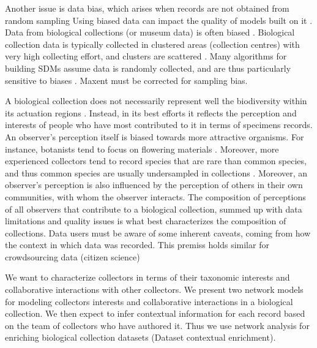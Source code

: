 Another issue is data bias, which arises when records are not obtained from random sampling \cite{Daru2017}
Using biased data can impact the quality of models built on it \cite{Newbold2010}.
Data from biological collections (or museum data) is often biased \cite{Daru2017}.
Biological collection data is typically collected in clustered areas (collection centres) with very high collecting effort, and clusters are scattered \cite{Nelson1990, VanGemerden2005}.
Many algorithms for building SDMs assume data is randomly collected, and are thus particularly sensitive to biases \cite{Araujo2016} .
Maxent must be corrected for sampling bias.%


A biological collection does not necessarily represent well the biodiversity within its actuation regions \cite{Funk1999}.
Instead, in its best efforts it reflects the perception and interests of people who have most contributed to it in terms of specimens records.
An observer's perception itself is biased towards more attractive organisms. 
For instance, botanists tend to focus on flowering materials \cite{VanGemerden2005}.
Moreover, more experienced collectors tend to record species that are rare than common species, and thus common species are usually undersampled in collections \cite{Nelson1990}.
Moreover, an observer's perception is also influenced by the perception of others in their own communities, with whom the observer interacts. 
The composition of perceptions of all observers that contribute to a biological collection, summed up with data limitations and quality issues is what best characterizes the composition of collections.
Data users must be aware of some inherent caveats, coming from how the context in which data was recorded. 
This premiss holds similar for crowdsourcing data (citizen science)


We want to characterize collectors in terms of their taxonomic interests and collaborative interactions with other collectors.
We present two network models for modeling collectors interests and collaborative interactions in a biological collection.
We then expect to infer contextual information for each record based on the team of collectors who have authored it.
Thus we use network analysis for enriching biological collection datasets (Dataset contextual enrichment).


